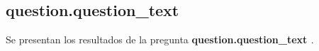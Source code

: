 \documentclass{article}
\begin{document}
  \subsection{ {{ question.question_text }} }

  Se presentan los resultados de la pregunta \textbf{ {{ question.question_text }} }.



\end{document}
